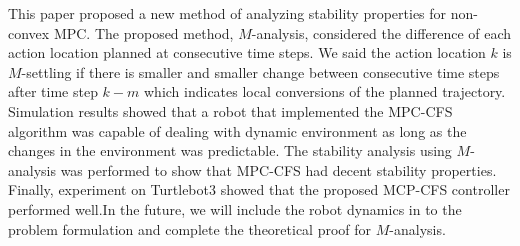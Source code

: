\documentclass[letterpaper, 10 pt, conference]{ieeeconf}  %
\begin{document}
This paper proposed a new method of analyzing stability properties for non-convex MPC. The proposed method, $M$-analysis, considered the difference of each action location planned at consecutive time steps. We said the action location $k$ is $M$-settling if there is smaller and smaller change between consecutive time steps after time step $k-m$ which indicates local conversions of the planned trajectory. Simulation results showed that a robot that implemented the MPC-CFS algorithm was capable of dealing with dynamic environment as long as the changes in the environment was predictable. The stability analysis using $M$-analysis was performed to show that MPC-CFS had decent stability properties. Finally, experiment on Turtlebot3 showed that the proposed MCP-CFS controller performed well.In the future, we will include the robot dynamics in to the problem formulation and complete the theoretical proof for $M$-analysis. 





\end{document}
